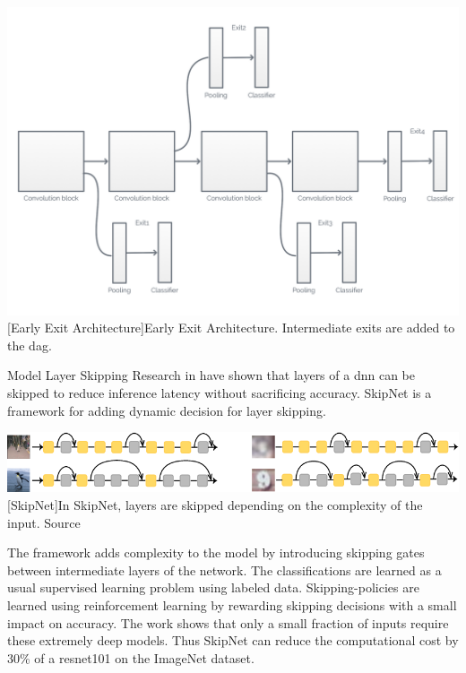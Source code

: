 \begin{enumdescript}
	\begin{minipage}[t]{\linewidth}    
		\centering                          
		\includegraphics[width=.7\linewidth]{figures/models/branchy}
		[Early Exit Architecture]{Early Exit Architecture. Intermediate exits are added to the \acrfull{dag}.}
		\label{fig:branchynet}
	\end{minipage}
	
	\item[Model Layer Skipping] Research in \cite{wang_skipnet:_2017, wu_blockdrop:_2017}  have shown that layers of a \gls{dnn} can be skipped to reduce inference latency without sacrificing accuracy. SkipNet \cite{wang_skipnet:_2017} is a framework for adding dynamic decision for layer skipping. 
	
	\begin{minipage}[t]{\linewidth}    
		\centering                          
		\includegraphics[width=.8\linewidth]{figures/models/skipnet}
		[SkipNet]{In SkipNet, layers are skipped depending on the complexity of the input. Source  \cite{wang_skipnet:_2017}}
	\end{minipage}
	
	The framework adds complexity to the model by introducing skipping gates between intermediate layers of the network. The classifications are learned as a usual supervised learning problem using labeled data. Skipping-policies are learned using reinforcement learning by rewarding skipping decisions with a small impact on accuracy. The work shows that only a small fraction of inputs require these extremely deep models. Thus SkipNet can reduce the computational cost by 30\% of a \gls{resnet}101 on the ImageNet dataset. 
	

\end{enumdescript}

